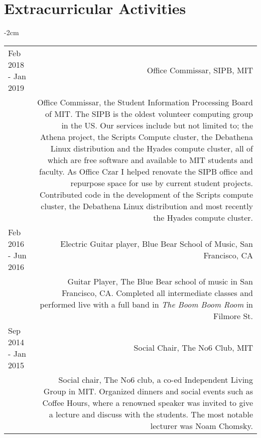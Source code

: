 \documentclass[lettersize,10pt]{article}
\begin{document}
\section{Extracurricular Activities}
\begin{adjustwidth}{}{-2cm}
  \begin{tabularx}{\textwidth}{L R}
    Feb 2018 - Jan 2019 & {\sc Office Commissar, SIPB, MIT} \\
	& Office Commissar, the Student Information Processing Board of MIT. The SIPB is the oldest volunteer computing group in the US.
    Our services include but not limited to; the Athena project, the Scripts Compute cluster, the Debathena Linux distribution and the
    Hyades compute cluster, all of which are free software and available to MIT students and faculty. As Office Czar I helped renovate
    the SIPB office and repurpose space for use by current student projects. Contributed code in the development of the Scripts compute
    cluster, the Debathena Linux distribution and most recently the Hyades compute cluster. \\
	Feb 2016 - Jun 2016 & {\sc Electric Guitar player, Blue Bear School of Music}, San Francisco, CA \\

    & Guitar Player, The Blue Bear school of music in San Francisco, CA. Completed all intermediate classes and performed live with a full
	  band in \emph{The Boom Boom Room} in Filmore St. \\
	Sep 2014 - Jan 2015 & {\sc Social Chair, The No6 Club, MIT} \\

    & Social chair, The No6 club, a co-ed Independent Living Group in MIT. Organized dinners and social events such as Coffee Hours,
    where a renowned speaker was invited to give a lecture and discuss with the students. The most notable lecturer was Noam Chomsky. \\
  \end{tabularx}
\end{adjustwidth}
\end{document}
